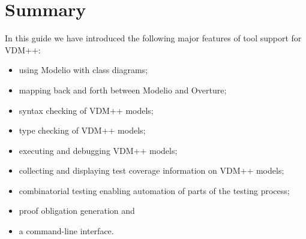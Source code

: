 \lstset{style=mystyle,language=VDM++}
%
\section{Summary}\label{sec:toolintrosummary}
In this guide we have introduced the following major features of tool support for VDM++:
%
\begin{itemize}
\item using Modelio with class diagrams;
\item mapping back and forth between Modelio and Overture;
\item syntax checking of VDM++ models;
\item type checking of VDM++ models;
\item executing and debugging VDM++ models;
\item collecting and displaying test coverage information on VDM++ models;
\item combinatorial testing enabling automation of parts of the testing process;
\item proof obligation generation and
\item a command-line interface.
\end{itemize}